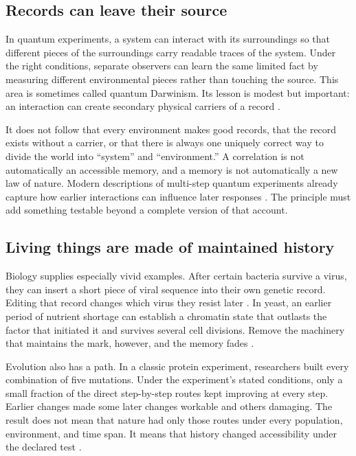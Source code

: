 \documentclass[11pt]{article}
\begin{document}
\subsection*{Records can leave their source}

In quantum experiments, a system can interact with its surroundings so that
different pieces of the surroundings carry readable traces of the system.
Under the right conditions, separate observers can learn the same limited
fact by measuring different environmental pieces rather than touching the
source. This area is sometimes called quantum Darwinism. Its lesson is modest
but important: an interaction can create secondary physical carriers of a
record
\citep{OllivierPoulinZurek2004Witness,BrandaoEtAl2015Darwinism,CiampiniEtAl2018DarwinismExperiment,ChenEtAl2019DarwinismExperiment,UndenEtAl2019Classicality}.

It does not follow that every environment makes good records, that the record
exists without a carrier, or that there is always one uniquely correct way to
divide the world into ``system'' and ``environment.'' A correlation is not
automatically an accessible memory, and a memory is not automatically a new
law of nature. Modern descriptions of multi-step quantum experiments already
capture how earlier interactions can influence later responses
\citep{PollockEtAl2018ProcessTensor,PollockEtAl2018Markov}. The principle must
add something testable beyond a complete version of that account.

\subsection*{Living things are made of maintained history}

Biology supplies especially vivid examples. After certain bacteria survive a
virus, they can insert a short piece of viral sequence into their own genetic
record. Editing that record changes which virus they resist later
\citep{BarrangouEtAl2007CRISPR}. In yeast,
an earlier period of nutrient shortage can establish a chromatin state that
outlasts the factor that initiated it and survives several cell divisions.
Remove the machinery that maintains the mark, however, and the memory fades
\citep{LightEtAl2010INO1,SumpEtAl2022INO1Memory}.

Evolution also has a path. In a classic protein experiment, researchers built
every combination of five mutations. Under the experiment's stated conditions,
only a small fraction of the direct step-by-step routes kept improving at every
step. Earlier changes made some later changes workable and others damaging.
The result does not mean that nature had only those routes under every
population, environment, and time span. It means that history changed
accessibility under the declared test
\citep{WeinreichEtAl2006MutationalPaths,HarmsThornton2014Contingency}.
\end{document}
